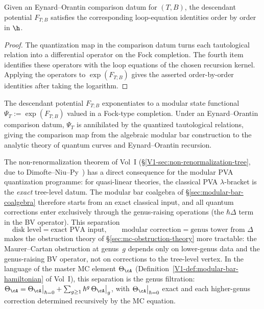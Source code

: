\begin{proposition}
\label{prop:descendant-constraints-from-comparison-datum}
Given an Eynard--Orantin comparison datum for $(T,B)$, the descendant potential
$F_{T;B}$ satisfies the corresponding loop-equation identities order by order in $\h$.
\end{proposition}

\begin{proof}
The quantization map in the comparison datum turns each tautological relation into a
differential operator on the Fock completion. The fourth item identifies these operators
with the loop equations of the chosen recursion kernel. Applying the operators to
$\exp(F_{T;B})$ gives the asserted order-by-order identities after taking the logarithm.
\end{proof}

\begin{remark}
\label{rem:descendant-state-functional}
The descendant potential $F_{T;B}$ exponentiates to a modular state functional
$\Psi_T := \exp(F_{T;B})$ valued in a Fock-type completion. Under an
Eynard--Orantin comparison datum, $\Psi_T$ is annihilated by the quantized tautological
relations, giving the comparison map from the algebraic modular bar construction to the
analytic theory of quantum curves and Eynard--Orantin recursion.
\end{remark}

\begin{remark}
\label{rem:pva-non-renormalization}
The non-renormalization theorem of Vol~I
(\S\ref*{V1-sec:non-renormalization-tree}, due to
Dimofte--Niu--Py~\cite{DNP2025}) has a direct consequence for the
modular PVA quantization programme: for quasi-linear theories, the
classical PVA $\lambda$-bracket is the \emph{exact} tree-level datum.
The modular bar coalgebra of
\S\ref*{sec:modular-bar-coalgebra} therefore starts from an exact
classical input, and all quantum corrections enter exclusively
through the genus-raising operations (the $\hbar\Delta$ term in the
BV operator). This separation
\[
 \text{disk level} = \text{exact PVA input},
 \qquad
 \text{modular correction} = \text{genus tower from $\Delta$}
\]
makes the obstruction theory of
\S\ref*{sec:mc-obstruction-theory} more tractable:
the Maurer--Cartan obstruction at genus~$g$ depends only on
lower-genus data and the genus-raising BV operator, not on corrections
to the tree-level vertex. In the language of the master MC element
$\Theta_{\cA}$ (Definition~\ref*{V1-def:modular-bar-hamiltonian} of
Vol~I), this separation is the genus filtration:
$\Theta_{\cA} = \Theta_{\cA}\big|_{\hbar=0} +
\sum_{g \geq 1} \hbar^g\,\Theta_{\cA}\big|_{g}$, with
$\Theta_{\cA}\big|_{\hbar=0}$ exact and each higher-genus correction
determined recursively by the MC equation.
\end{remark}


